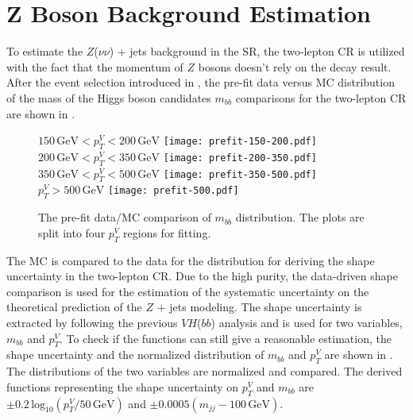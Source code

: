 \documentclass[class=NTHU_thesis, crop=false]{standalone}
\begin{document}
\chapter{Z Boson Background Estimation}
\label{chap:Z_bkg_estimation}
To estimate the $Z$($\nu\nu$) + jets background in the SR, the two-lepton CR is utilized with the fact that the momentum of $Z$ bosons doesn't rely on the decay result. After the event selection introduced in , the pre-fit data versus MC distribution of the mass of the Higgs boson candidates $m_{bb}$ comparisons for the two-lepton CR are shown in .

\begin{figure}[!hbt]
	\captionsetup[subfigure]{labelformat=empty}
	\centering
	\subcaptionbox
		{$150\, \mathrm{GeV} < p^V_T < 200\, \mathrm{GeV}$
		\label{fig:2-lep-prefit-fig1}}
		{\texttt{[image: prefit-150-200.pdf]}}
	\subcaptionbox
		{$200\, \mathrm{GeV} < p^V_T < 350\, \mathrm{GeV}$
		\label{fig:2-lep-prefit-fig2}}
		{\texttt{[image: prefit-200-350.pdf]}}
	\vspace{\baselineskip}
	\subcaptionbox
		{$350\, \mathrm{GeV} < p^V_T < 500\, \mathrm{GeV}$
		\label{fig:2-lep-prefit-fig3}}
		{\texttt{[image: prefit-350-500.pdf]}}
	\subcaptionbox
		{$p^V_T > 500\, \mathrm{GeV}$
		\label{fig:2-lep-prefit-fig4}}
		{\texttt{[image: prefit-500.pdf]}}
	\caption{The pre-fit data/MC comparison of $m_{bb}$ distribution. The plots are split into four $p^V_T$ regions for fitting.}
	\label{fig:2-lep-prefit}
\end{figure}

The MC is compared to the data for the distribution for deriving the shape uncertainty in the two-lepton CR. Due to the high purity, the data-driven shape comparison is used for the estimation of the systematic uncertainty on the theoretical prediction of the $Z$ + jets modeling. The shape uncertainty is extracted by following the previous $VH$($bb$) analysis \cite{ATLAS-CONF-2018-036} and is used for two variables, $m_{bb}$ and $p^V_T$. To check if the functions can still give a reasonable estimation, the shape uncertainty and the normalized distribution of $m_{bb}$ and $p^V_T$ are shown in . The distributions of the two variables are normalized and compared. The derived functions representing the shape uncertainty on $p^V_T$ and $m_{bb}$ are $\pm 0.2\, \mathrm{log}_{10} (p^V_T/50\, \mathrm{GeV})$ and $\pm 0.0005 (m_{jj} - 100\, \mathrm{GeV})$.
\end{document}
